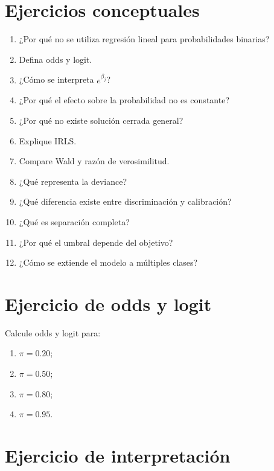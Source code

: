 \documentclass[
  spanish,
  10.5pt,
  letterpaper,
  DIV=11,
  numbers=noendperiod,
  oneside,
  open=any]{scrreprt}
\providecommand{\tightlist}{%
  \setlength{\itemsep}{0pt}\setlength{\parskip}{0pt}}
\theoremstyle{definition}
\theoremstyle{definition}
\theoremstyle{plain}
\theoremstyle{remark}
\begin{document}
\section*{Ejercicios conceptuales}\label{ejercicios-conceptuales-9}


\begin{enumerate}
\def\labelenumi{\arabic{enumi}.}
\tightlist
\item
  ¿Por qué no se utiliza regresión lineal para probabilidades binarias?
\item
  Defina odds y logit.
\item
  ¿Cómo se interpreta \(e^{\beta_j}\)?
\item
  ¿Por qué el efecto sobre la probabilidad no es constante?
\item
  ¿Por qué no existe solución cerrada general?
\item
  Explique IRLS.
\item
  Compare Wald y razón de verosimilitud.
\item
  ¿Qué representa la deviance?
\item
  ¿Qué diferencia existe entre discriminación y calibración?
\item
  ¿Qué es separación completa?
\item
  ¿Por qué el umbral depende del objetivo?
\item
  ¿Cómo se extiende el modelo a múltiples clases?
\end{enumerate}

\section*{Ejercicio de odds y logit}\label{ejercicio-de-odds-y-logit}


Calcule odds y logit para:

\begin{enumerate}
\def\labelenumi{\arabic{enumi}.}
\tightlist
\item
  \(\pi=0.20\);
\item
  \(\pi=0.50\);
\item
  \(\pi=0.80\);
\item
  \(\pi=0.95\).
\end{enumerate}

\section*{Ejercicio de
interpretación}\label{ejercicio-de-interpretaciuxf3n-1}
\end{document}
